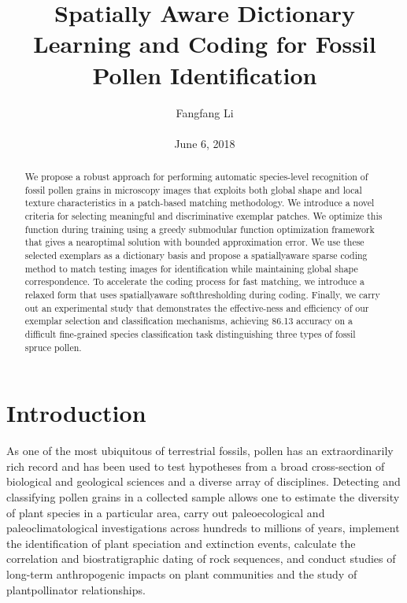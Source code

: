 \documentclass[10pt,twocolumn,letterpaper]{article}
\title{\textbf{Spatially Aware Dictionary Learning and Coding for Fossil Pollen Identification
}}
\author{Fangfang Li\\\\June 6, 2018}
\begin{document}
\maketitle

\begin{abstract}
  We propose a robust approach for performing automatic species-level recognition of fossil pollen grains in microscopy images that exploits both global shape and local texture characteristics in a patch-based matching methodology. We introduce a novel criteria for selecting meaningful and discriminative exemplar patches. We optimize this function during training using a greedy submodular function optimization framework that gives a nearoptimal solution with bounded approximation error. We use these selected exemplars as a dictionary basis and propose a spatiallyaware sparse coding method to match testing images for identification while maintaining global shape correspondence. To accelerate the coding process for fast matching, we introduce a relaxed form that uses spatiallyaware softthresholding during coding. Finally, we carry out an experimental study that demonstrates the effective-ness and efficiency of our exemplar selection and classification mechanisms, achieving 86.13 accuracy on a difficult fine-grained species classification task distinguishing three types of fossil spruce pollen.
\end{abstract}

\section{Introduction}
As one of the most ubiquitous of terrestrial fossils, pollen has an extraordinarily rich record and has been used to test hypotheses from a broad cross-section of biological and geological sciences and a diverse array of disciplines. Detecting and classifying pollen grains in a collected sample allows one to estimate the diversity of plant species in a particular area, carry out paleoecological and paleoclimatological investigations across hundreds to millions of years, implement the identification of plant speciation and extinction events, calculate the correlation and biostratigraphic dating of rock sequences, and conduct studies of long-term anthropogenic impacts on plant communities and the study of plantpollinator relationships.
\end{document}
